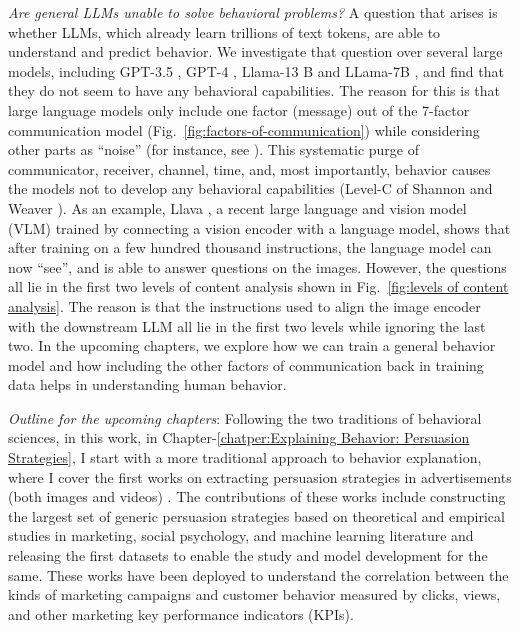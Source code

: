 \documentclass[PhD]{iiitd}
\renewcommand{\cite}[1]{\citep{#1}}
\begin{document}
\textit{Are general LLMs unable to solve behavioral problems?} A question that arises is whether LLMs, which already learn trillions of text tokens, are able to understand and predict behavior. We investigate that question over several large models, including GPT-3.5 \cite{brown2020language}, GPT-4 \cite{openai2023gpt4}, Llama-13 B and LLama-7B \cite{touvron2023llama}, and find that they do not seem to have any behavioral capabilities. The reason for this is that large language models only include one factor (message) out of the 7-factor communication model (Fig.~\ref{fig:factors-of-communication}) while considering other parts as ``noise'' (for instance, see \cite{biderman2022datasheet,penedo2023refinedweb}). This systematic purge of communicator, receiver, channel, time, and, most importantly, behavior causes the models not to develop any behavioral capabilities (Level-C of Shannon and Weaver \cite{shannon-weaver-1949}). As an example, Llava \cite{liu2023visual}, a recent large language and vision model (VLM) trained by connecting a vision encoder with a language model, shows that after training on a few hundred thousand instructions, the language model can now ``see'', and is able to answer questions on the images. However, the questions all lie in the first two levels of content analysis shown in Fig.~\ref{fig:levels of content analysis}. The reason is that the instructions used to align the image encoder with the downstream LLM all lie in the first two levels while ignoring the last two. 
In the upcoming chapters, we explore how we can train a general behavior model and how including the other factors of communication back in training data helps in understanding human behavior.


\textit{Outline for the upcoming chapters}: Following the two traditions of behavioral sciences, in this work, in Chapter-\ref{chatper:Explaining Behavior: Persuasion Strategies}, I start with a more traditional approach to behavior explanation, where I cover the first works on extracting persuasion strategies in advertisements (both images and videos) \cite{kumar2023persuasion,bhattacharya2023video}. The contributions of these works include constructing the largest set of generic persuasion strategies based on theoretical and empirical studies in marketing, social psychology, and machine learning literature and releasing the first datasets to enable the study and model development for the same. These works have been deployed to understand the correlation between the kinds of marketing campaigns and customer behavior measured by clicks, views, and other marketing key performance indicators (KPIs). 
\end{document}
